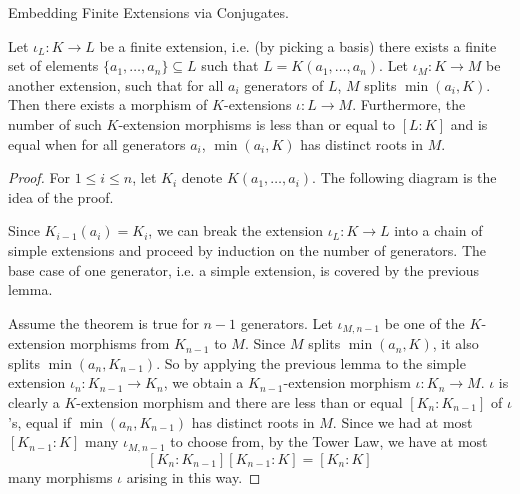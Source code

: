 \documentclass[../book.tex]{subfiles}
\begin{document}
\begin{thm} Embedding Finite Extensions via Conjugates.
    
    Let $\iota_L : K \to L$ be a finite extension, i.e. (by picking a basis)
    there exists a finite set of elements $\{a_1,\dots,a_n\} \subseteq L$ such that 
    $L = K(a_1, \dots, a_n)$. 
    Let $\iota_M : K \to M$ be another extension, such that 
    for all $a_i$ generators of $L$, $M$ splits $\min(a_i,K)$. 
    Then there exists a morphism of $K$-extensions $\iota : L \to M$.
    Furthermore, the number of such $K$-extension morphisms is less than or equal
    to $[L : K]$ and is equal when for all generators $a_i$, 
    $\min(a_i,K)$ has distinct roots in $M$. 
\end{thm}
\begin{proof}
    For $1 \leq i \leq n$, let $K_i$ denote $K(a_1,\dots,a_i)$.
    The following diagram is the idea of the proof. 
    \begin{figure}[H]
        \centering
    \end{figure}
    Since $K_{i-1}(a_i) = K_i$, 
    we can break the extension $\iota_L : K \to L$ into a chain of simple extensions
    and proceed by induction on the number of generators. 
    The base case of one generator, i.e. a simple extension, 
    is covered by the previous lemma. 
    
    Assume the theorem is true for $n-1$ generators. 
    Let $\iota_{M,n-1}$ be one of the $K$-extension morphisms from
    $K_{n-1}$ to $M$. 
    Since $M$ splits $\min(a_n,K)$, it also splits $\min(a_n,K_{n-1})$.
    So by applying the previous lemma to the simple extension
    $\iota_n : K_{n-1} \to K_n$,
    we obtain a $K_{n-1}$-extension morphism $\iota : K_n \to M$.
    $\iota$ is clearly a $K$-extension morphism and
    there are less than or equal $[K_n : K_{n-1}]$ of $\iota$'s,
    equal if $\min(a_n,K_{n-1})$ has distinct roots in $M$. 
    Since we had at most $[K_{n-1} : K]$ many $\iota_{M,n-1}$
    to choose from, by the Tower Law, we have at most \[
        [K_n : K_{n-1}][K_{n-1} : K] = [K_n : K]
    \]
    many morphisms $\iota$ arising in this way.
    

\end{proof}
\end{document}
